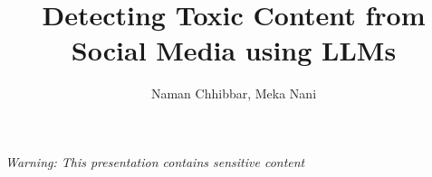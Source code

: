\documentclass{beamer}
\title{Detecting Toxic Content from Social Media using LLMs}
\author[Naman Chhibbar \\ Meka Nani]{Naman Chhibbar, Meka Nani}
\institute{Indian Institute of Technology Hyderabad}
\date{}
\begin{document}
\begin{frame}
  \titlepage
  \centering
  \textit{\scriptsize Warning: This presentation contains sensitive content}
\end{frame}




% 





\end{document}
